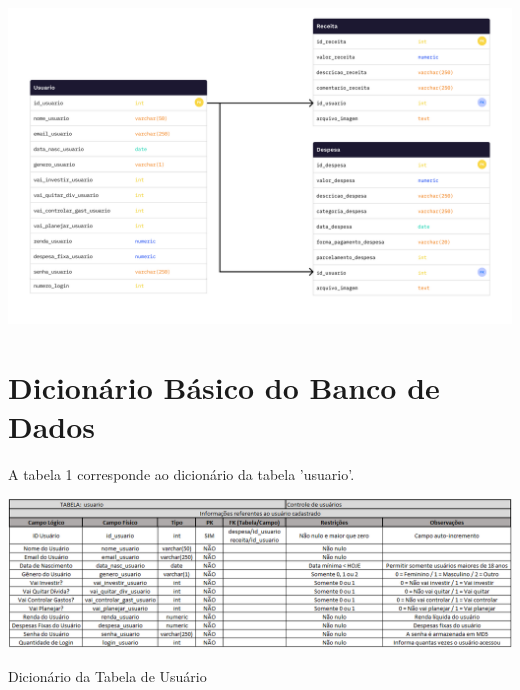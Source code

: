     \vspace{\baselineskip}
    \begin{center}
        \begin{minipage}{\textwidth}
            \centering
            \includegraphics[scale=0.18]{figs/uml.png}
            \label{fig:uml}
        \end{minipage}
    \end{center}

\section{Dicionário Básico do Banco de Dados}

    A tabela 1 corresponde ao dicionário da tabela 'usuario'.

\begin{table}[ht]
    \centering
    \setlength{\extrarowheight}{3pt}  %

    \begin{center}
        \begin{minipage}{\textwidth}
            \centering
            \includegraphics[scale=0.5]{figs/tab1.png}
        \end{minipage}
    \end{center}

    \caption{Dicionário da Tabela de Usuário}
    \label{tab:tab1}
\end{table}

